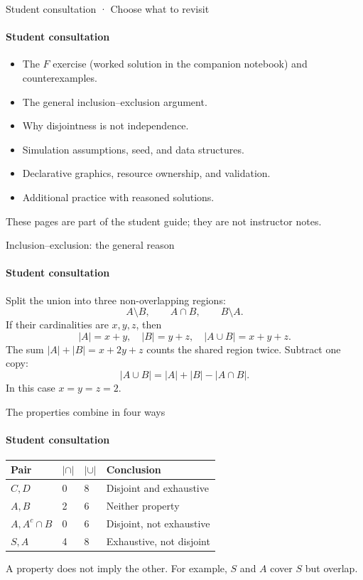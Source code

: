 \documentclass[aspectratio=169,11pt,english]{beamer}
\newcommand{\ruta}{Class route · 50 minutes}
\begin{document}
\appendix
\renewcommand{\ruta}{Student consultation}

\begin{frame}{Student consultation · Choose what to revisit}
  \framesubtitle{Student consultation}
  \begin{itemize}
    \item The $F$ exercise (worked solution in the companion notebook) and counterexamples.
    \item The general inclusion--exclusion argument.
    \item Why disjointness is not independence.
    \item Simulation assumptions, seed, and data structures.
    \item Declarative graphics, resource ownership, and validation.
    \item Additional practice with reasoned solutions.
  \end{itemize}
  These pages are part of the student guide; they are not instructor notes.
\end{frame}

\begin{frame}{Inclusion--exclusion: the general reason}
  \framesubtitle{Student consultation}
  Split the union into three non-overlapping regions:
  \[
    A\setminus B,\qquad A\cap B,\qquad B\setminus A.
  \]
  If their cardinalities are $x,y,z$, then
  \[
    |A|=x+y,\quad |B|=y+z,\quad |A\cup B|=x+y+z.
  \]
  The sum $|A|+|B|=x+2y+z$ counts the shared region twice. Subtract one copy:
  \[
    \boxed{|A\cup B|=|A|+|B|-|A\cap B|}.
  \]
  In this case $x=y=z=2$.
\end{frame}

\begin{frame}{The properties combine in four ways}
  \framesubtitle{Student consultation}
  \begin{tabular}{llll}
    \toprule Pair & $|\cap|$ & $|\cup|$ & Conclusion \\ \midrule
    $C,D$ & 0 & 8 & Disjoint and exhaustive\\
    $A,B$ & 2 & 6 & Neither property\\
    $A, A^c\cap B$ & 0 & 6 & Disjoint, not exhaustive\\
    $S,A$ & 4 & 8 & Exhaustive, not disjoint\\ \bottomrule
  \end{tabular}
  \par\medskip
  A property does not imply the other. For example, $S$ and $A$ cover $S$ but overlap.
\end{frame}
\end{document}
